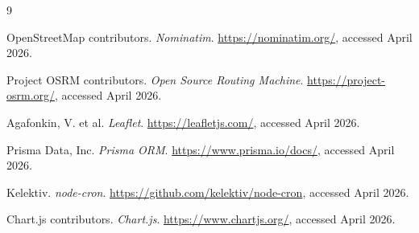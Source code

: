 \documentclass[11pt,letterpaper]{article}
\begin{document}
\begin{thebibliography}{9}

OpenStreetMap contributors.
\textit{Nominatim}.
\url{https://nominatim.org/}, accessed April 2026.

Project OSRM contributors.
\textit{Open Source Routing Machine}.
\url{https://project-osrm.org/}, accessed April 2026.

Agafonkin, V. et al.
\textit{Leaflet}.
\url{https://leafletjs.com/}, accessed April 2026.

Prisma Data, Inc.
\textit{Prisma ORM}.
\url{https://www.prisma.io/docs/}, accessed April 2026.

Kelektiv.
\textit{node-cron}.
\url{https://github.com/kelektiv/node-cron}, accessed April 2026.

Chart.js contributors.
\textit{Chart.js}.
\url{https://www.chartjs.org/}, accessed April 2026.

\end{thebibliography}
\end{document}
